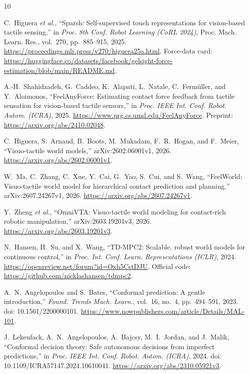 \documentclass[letterpaper,10pt,conference]{ieeeconf}
\begin{document}
\begin{thebibliography}{10}

C.~Higuera \emph{et al.}, ``Sparsh: Self-supervised touch representations for
vision-based tactile sensing,'' in \emph{Proc. 8th Conf. Robot Learning
(CoRL 2024)}, Proc. Mach. Learn. Res., vol.~270, pp.~885--915, 2025.
\url{https://proceedings.mlr.press/v270/higuera25a.html}.
Force-data card:
\url{https://huggingface.co/datasets/facebook/gelsight-force-estimation/blob/main/README.md}.

A.-H.~Shahidzadeh, G.~Caddeo, K.~Alapati, L.~Natale, C.~Ferm\"uller, and
Y.~Aloimonos, ``FeelAnyForce: Estimating contact force feedback from tactile
sensation for vision-based tactile sensors,'' in \emph{Proc. IEEE Int. Conf.
Robot. Autom. (ICRA)}, 2025.
\url{https://www.prg.cs.umd.edu/FeelAnyForce}.
Preprint: \url{https://arxiv.org/abs/2410.02048}.

C.~Higuera, S.~Arnaud, B.~Boots, M.~Mukadam, F.~R.~Hogan, and F.~Meier,
``Visuo-tactile world models,'' arXiv:2602.06001v1, 2026.
\url{https://arxiv.org/abs/2602.06001v1}.

W.~Ma, C.~Zhang, C.~Xue, Y.~Cai, G.~Yao, S.~Cui, and S.~Wang,
``FeelWorld: Visuo-tactile world model for hierarchical contact prediction
and planning,'' arXiv:2607.24267v1, 2026.
\url{https://arxiv.org/abs/2607.24267v1}.

Y.~Zheng \emph{et al.}, ``OmniVTA: Visuo-tactile world modeling for contact-rich
robotic manipulation,'' arXiv:2603.19201v3, 2026.
\url{https://arxiv.org/abs/2603.19201v3}.

N.~Hansen, H.~Su, and X.~Wang, ``TD-MPC2: Scalable, robust world models for
continuous control,'' in \emph{Proc. Int. Conf. Learn. Representations (ICLR)},
2024. \url{https://openreview.net/forum?id=Oxh5CstDJU}.
Official code: \url{https://github.com/nicklashansen/tdmpc2}.

A.~N.~Angelopoulos and S.~Bates, ``Conformal prediction: A gentle introduction,''
\emph{Found. Trends Mach. Learn.}, vol.~16, no.~4, pp.~494--591, 2023.
doi: 10.1561/2200000101.
\url{https://www.nowpublishers.com/article/Details/MAL-101}.

J.~Lekeufack, A.~N.~Angelopoulos, A.~Bajcsy, M.~I.~Jordan, and J.~Malik,
``Conformal decision theory: Safe autonomous decisions from imperfect
predictions,'' in \emph{Proc. IEEE Int. Conf. Robot. Autom. (ICRA)}, 2024.
doi: 10.1109/ICRA57147.2024.10610041.
\url{https://arxiv.org/abs/2310.05921v3}.


\end{thebibliography}
\end{document}
